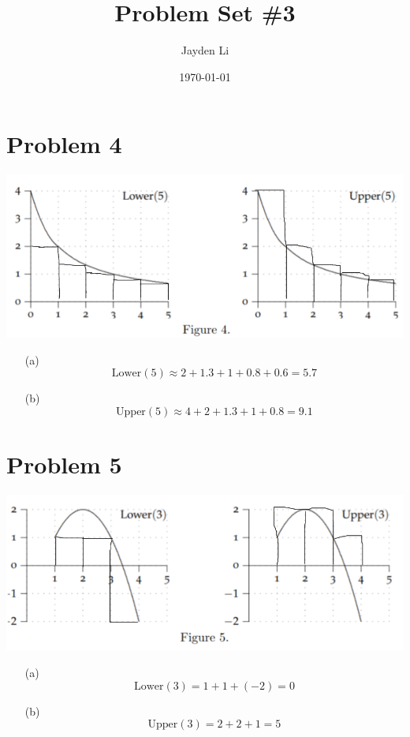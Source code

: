 \documentclass[preview, margin=0.6in]{standalone}
\title{\vspace*{-30pt}Problem Set \#3}
\author{Jayden Li}
\date{\today}
\newcommand*{\problem}[1]{\section*{Problem #1}}
\begin{document}
\fontsize{12pt}{12pt}\selectfont
\setlength{\abovedisplayskip}{0pt}
\maketitle

\problem{4}
\begin{center}
	\includegraphics[scale=2]{p4.png}
\end{center}
\begin{itemize}
	\item[(a)]
		\begin{equation*}
			\mathrm{Lower}(5)\approx 2+1.3+1+0.8+0.6
			=5.7
		\end{equation*}
	\item[(b)]
		\begin{equation*}
			\mathrm{Upper}(5)\approx 4+2+1.3+1+0.8
			=9.1
		\end{equation*}
\end{itemize}

\problem{5}
\begin{center}
	\includegraphics[scale=2]{p5.png}
\end{center}
\begin{itemize}
	\item[(a)]
		\begin{equation*}
			\mathrm{Lower}(3)=1+1+(-2)=0
		\end{equation*}
	\item[(b)]
		\begin{equation*}
			\mathrm{Upper}(3)=2+2+1=5
		\end{equation*}
\end{itemize}
\end{document}
